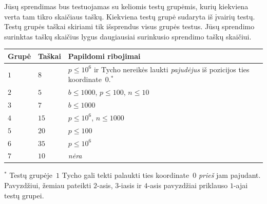 Jūsų sprendimas bus testuojamas su keliomis testų grupėmis, kurių kiekviena verta tam tikro skaičiaus taškų.
Kiekviena testų grupė sudaryta iš įvairių testų.
Testų grupės taškai skiriami tik išsprendus visus grupės testus.
Jūsų sprendimo surinktas taškų skaičius lygus daugiausiai surinkusio sprendimo taškų skaičiui.

\medskip
\begin{tabular}{lll}
Grupė & Taškai & Papildomi ribojimai \\\hline
  $1$ & $8$  & $p\leq 10^6$ ir Tycho nereikės laukti \emph{pajudėjus} iš pozicijos ties koordinate~$0$.$^*$ \\ %
  $2$ & $5$  & $b\leq 1000$, $p\leq 100$, $n\leq 10$ \\
  $3$ & $7$  & $b\leq 1000$ \\
  $4$ & $15$ & $p\leq 10^6$, $n\leq 1000$\\
  $5$ & $20$ & $p\leq 100$\\
  $6$ & $35$ & $p\leq 10^6$\\
  $7$ & $10$ & \emph{nėra}
\end{tabular}

\medskip
\noindent $^*$ Testų grupėje~$1$ Tycho gali tekti palaukti ties koordinate~$0$ \emph{prieš} jam pajudant.
Pavyzdžiui, žemiau pateikti $2$-asis, $3$-iasis ir $4$-asis pavyzdžiai priklauso $1$-ajai testų grupei.
